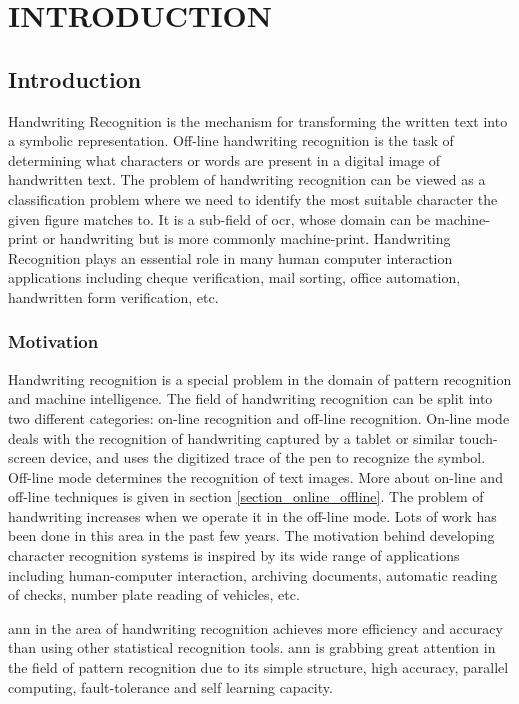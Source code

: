 \chapter{INTRODUCTION}\label{chapter_introduction}
\section{Introduction}

Handwriting Recognition is the mechanism for transforming the written text into a symbolic representation. Off-line handwriting recognition is the task of determining what characters or words are present in a digital image of handwritten text. The problem of handwriting recognition can be viewed as a classification problem where we need to identify the most suitable character the given figure matches to. It is a sub-field of \ac{ocr}, whose domain can be machine-print or handwriting but is more commonly machine-print. Handwriting Recognition plays an essential role in many human computer interaction applications including cheque verification, mail sorting, office automation, handwritten form verification, etc.

\subsection{Motivation}
Handwriting recognition is a special problem in the domain of pattern recognition and machine intelligence. The field of handwriting recognition can be split into two different categories: on-line recognition and off-line recognition.  On-line mode deals with the recognition of handwriting captured by a tablet or similar touch-screen device, and uses the digitized trace of the pen to recognize the symbol. Off-line mode determines the recognition of text images. More about on-line and off-line techniques is given in section \ref{section_online_offline}.  The problem of handwriting increases when we operate it in the off-line mode. Lots of work has been done in this area in the past few years. The motivation behind developing character recognition systems is inspired by its wide range of applications including human-computer interaction, archiving documents, automatic reading of checks, number plate reading of vehicles, etc.

\ac{ann} in the area of handwriting recognition achieves more efficiency and accuracy than using other statistical recognition tools. \ac{ann} is grabbing great attention in the field of pattern recognition due to its simple structure, high accuracy, parallel computing, fault-tolerance and self learning capacity.

